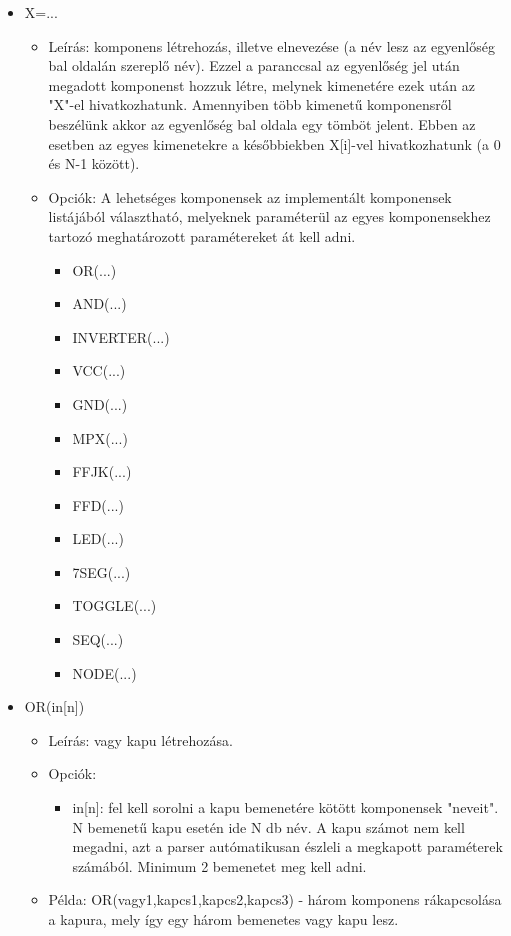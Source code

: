 \begin{itemize}
\item X=...
	\begin{itemize}
	\item Leírás: komponens létrehozás, illetve elnevezése (a név lesz az egyenlőség bal oldalán szereplő név). Ezzel a paranccsal az egyenlőség jel után megadott komponenst hozzuk létre, melynek kimenetére ezek után az "X"-el hivatkozhatunk. Amennyiben több kimenetű komponensről beszélünk akkor az egyenlőség bal oldala egy tömböt jelent. Ebben az esetben az egyes kimenetekre a későbbiekben X[i]-vel hivatkozhatunk (a 0 és N-1 között).
	\item Opciók: A lehetséges komponensek az implementált komponensek listájából választható, melyeknek paraméterül az egyes komponensekhez tartozó meghatározott paramétereket át kell adni.
		\begin{itemize}
			\item OR(...)			%
			\item AND(...)			%
			\item INVERTER(...)		%
			\item VCC(...)			%
			\item GND(...)			%
			\item MPX(...)			%
			\item FFJK(...)			%
			\item FFD(...)			%
			\item LED(...)			%
			\item 7SEG(...)			%
			\item TOGGLE(...)		%
			\item SEQ(...)			%
			\item NODE(...)			%
		\end{itemize}
	\end{itemize}

\item OR(in[n])
	\begin{itemize}
	\item Leírás: vagy kapu létrehozása.
	\item Opciók: 
		\begin{itemize}
			\item in[n]: fel kell sorolni a kapu bemenetére kötött komponensek "neveit". N bemenetű kapu esetén ide N db név. A kapu számot nem kell megadni, azt a parser autómatikusan észleli a megkapott paraméterek számából. Minimum 2 bemenetet meg kell adni.
		\end{itemize}
	\item Példa: OR(vagy1,kapcs1,kapcs2,kapcs3) - három komponens rákapcsolása a kapura, mely így egy három bemenetes vagy kapu lesz.
	\end{itemize}


\end{itemize}
